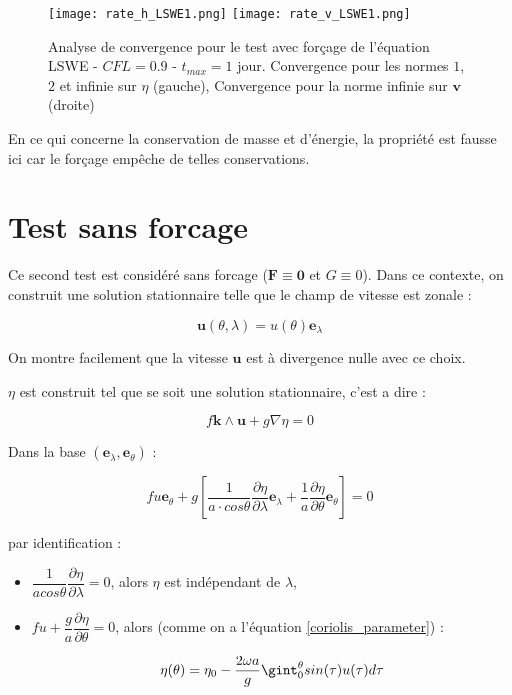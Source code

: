 \begin{figure}[ht!]
\begin{center}
\texttt{[image: rate\_h\_LSWE1.png]}
\texttt{[image: rate\_v\_LSWE1.png]}
\caption{Analyse de convergence pour le test avec forçage de l'équation LSWE - $CFL=0.9$ - $t_{max}=1$ jour. Convergence pour les normes $1$, $2$ et infinie sur $\eta$ (gauche), Convergence pour la norme infinie sur $\mathbf{v}$ (droite)}
\label{fig:accuracy lswe 1}
\end{center}
\end{figure}

En ce qui concerne la conservation de masse et d'énergie, la propriété est fausse ici car le forçage empêche de telles conservations.

\section{Test sans forcage}


Ce second test est considéré sans forcage ($\mathbf{F} \equiv \mathbf{0}$ et $G \equiv 0$). Dans ce contexte, on construit une solution stationnaire telle que le champ de vitesse est zonale :

$$\mathbf{u}(\theta, \lambda) = u(\theta) \mathbf{e}_{\lambda}$$

On montre facilement que la vitesse $ \mathbf{u}$ est à divergence nulle avec ce choix.

$\eta$ est construit tel que se soit une solution stationnaire, c'est a dire :

\begin{equation}
f \mathbf{k} \wedge \mathbf{u} + g \nabla \eta = 0
\end{equation} 

Dans la base $(\mathbf{e}_{\lambda}, \mathbf{e}_{\theta})$ :

\begin{equation}
f u \mathbf{e}_{\theta} + g \left[ \dfrac{1}{a \cdot cos \theta} \dfrac{\partial \eta}{\partial \lambda} \mathbf{e}_{\lambda} + \dfrac{1}{a}\dfrac{\partial \eta}{\partial \theta} \mathbf{e}_{\theta} \right] = 0
\end{equation}

par identification :

\begin{itemize}
\item $\dfrac{1}{a cos \theta} \dfrac{\partial \eta}{\partial \lambda} = 0$, alors $\eta$ est indépendant de $\lambda$,

\item $f u + \dfrac{g}{a} \dfrac{\partial \eta}{\partial \theta} = 0$, alors (comme on a l'équation \eqref{coriolis_parameter}) :

\begin{equation}
\eta (\theta ) = \eta_0 - \dfrac{2 \omega a}{g} \gint_0^{\theta} sin(\tau) u(\tau) d \tau
\end{equation} 
\end{itemize}

